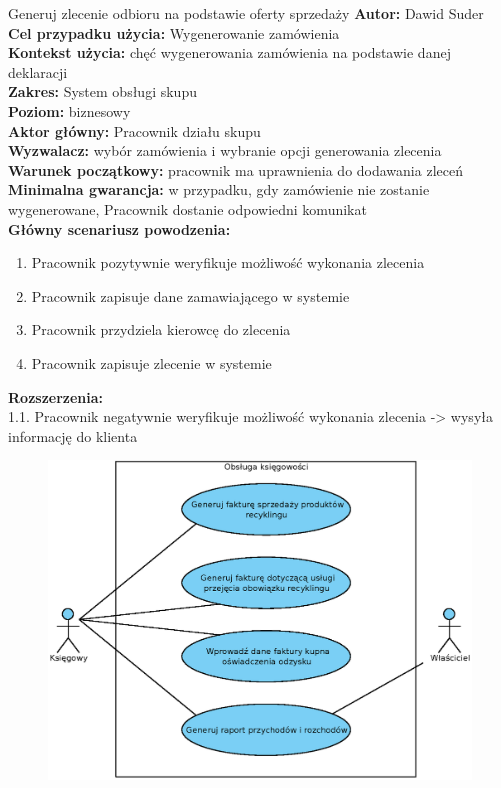 \begin{usecase}{Generuj zlecenie odbioru na podstawie oferty sprzedaży}
	\textbf{Autor:} Dawid Suder \\
	\textbf{Cel przypadku użycia:} Wygenerowanie zamówienia \\
	\textbf{Kontekst użycia:} chęć wygenerowania zamówienia na podstawie danej deklaracji\\
	\textbf{Zakres:} System obsługi skupu \\
	\textbf{Poziom:} biznesowy \\
	\textbf{Aktor główny:} Pracownik działu skupu\\
	\textbf{Wyzwalacz:} wybór zamówienia i wybranie opcji generowania zlecenia \\
	\textbf{Warunek początkowy:} pracownik ma uprawnienia do dodawania zleceń \\
	\textbf{Minimalna gwarancja:} w przypadku, gdy zamówienie nie zostanie wygenerowane, Pracownik dostanie odpowiedni komunikat \\
	\textbf{Główny scenariusz powodzenia:} \\
		\begin{enumerate}
			\item Pracownik pozytywnie weryfikuje możliwość wykonania zlecenia
			\item Pracownik zapisuje dane zamawiającego w systemie
			\item Pracownik przydziela kierowcę do zlecenia
			\item Pracownik zapisuje zlecenie w systemie
		\end{enumerate}
	\textbf{Rozszerzenia:} \\
			1.1. Pracownik negatywnie weryfikuje możliwość wykonania zlecenia -> wysyła informację do klienta
\end{usecase}

\begin{figure}[H]
	\centering
	\includegraphics[width=.8\textwidth]{img/UC/ksiegowosc.eps}
\end{figure}

